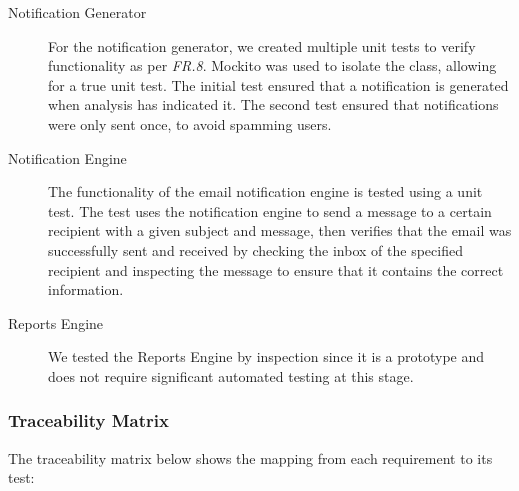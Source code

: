\documentclass[10pt,a4paper]{article}
\newcommand{\frit}[1]{\textit{FR.#1}}
\begin{document}
\begin{description}
  \item[Notification Generator] For the notification generator, we created 
	multiple unit tests to verify functionality as per \frit{8}. Mockito was 
	used to isolate the class, allowing for a true unit test. The initial 
	test ensured that a notification is generated when analysis has indicated 
	it. The second test ensured that notifications were only sent once, to 
	avoid spamming users.	 
  
  \item[Notification Engine] The functionality of the email notification 
	engine is tested using a unit test. The test uses the notification engine 
	to send a message to a certain recipient with a given subject and message, 
	then verifies that the email was successfully sent and received by checking 
	the inbox of the specified recipient and inspecting the message to ensure 
	that it contains the correct information.

  \item[Reports Engine] We tested the Reports Engine by inspection since it 
	is a prototype and does not require significant automated testing at this 
	stage.

 \end{description}

\subsubsection{Traceability Matrix}

The traceability matrix below shows the mapping from each requirement to its test:
\end{document}
